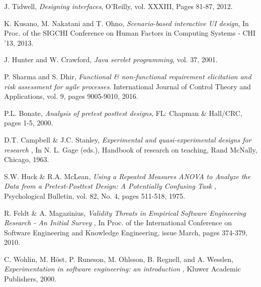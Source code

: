 \begin{thebibliography}{1}
	 J. Tidwell, {\em Designing interfaces}, O'Reilly, vol. XXXIII, Pages 81-87, 2012.
	
	 K. Kusano, M. Nakatani and T. Ohno, {\em Scenario-based interactive UI design}, In Proc. of the SIGCHI Conference on Human Factors in Computing Systems - CHI '13, 2013.
	
	 J. Hunter and W. Crawford, {\em Java servlet programming}, vol. 37, 2001.
	
	 P. Sharma and S. Dhir, {\em Functional \& non-functional requirement elicitation and risk assessment for agile processes}. International Journal of Control Theory and Applications, vol. 9, pages 9005-9010, 2016.
	
	 P.L. Bonate, {\em Analysis of pretest posttest designs}, FL: Chapman \& Hall/CRC, pages 1-5, 2000.
	
	 D.T. Campbell \& J.C. Stanley, {\em Experimental and quasi-experimental designs for research }, In N. L. Gage (eds.), Handbook of research on teaching, Rand McNally, Chicago, 1963.
	
	 S.W. Huck \& R.A. McLean, {\em Using a Repeated Measures ANOVA to Analyze the Data from a Pretest-Posttest Design: A Potentially Confusing Task }, Psychological Bulletin, vol. 82, No. 4, pages 511-518, 1975. 
	
	 R. Feldt \& A. Magazinius, {\em Validity Threats in Empirical Software Engineering Research - An Initial Survey } , In Proc. of the International Conference on Software Engineering and Knowledge Engineering, issue March, pages 374-379, 2010.
	
	 C. Wohlin, M. H\"ost, P. Runeson, M. Ohlsson, B. Regnell, and A. Wesslen, {\em Experimentation in software engineering: an introduction }, Kluwer Academic Publishers, 2000.
	
	
\end{thebibliography}



